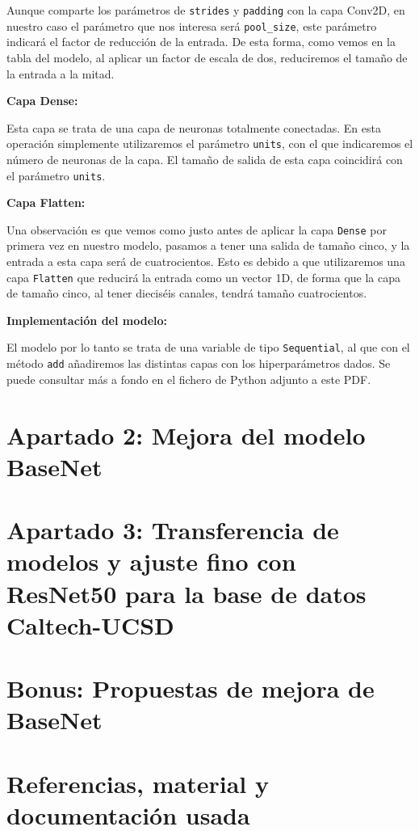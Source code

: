 \documentclass[12pt, spanish]{article}
\begin{document}
Aunque comparte los parámetros de \texttt{strides} y \texttt{padding} con la capa Conv2D, en nuestro caso el parámetro que nos interesa será \texttt{pool\_size}, este parámetro indicará el factor de reducción de la entrada. De esta forma, como vemos en la tabla del modelo, al aplicar un factor de escala de dos, reduciremos el tamaño de la entrada a la mitad.


\textbf{Capa Dense:}

Esta capa se trata de una capa de neuronas totalmente conectadas. En esta operación simplemente utilizaremos el parámetro \texttt{units}, con el que indicaremos el número de neuronas de la capa. El tamaño de salida de esta capa coincidirá con el parámetro \texttt{units}.


\textbf{Capa Flatten:}


Una observación es que vemos como justo antes de aplicar la capa \texttt{Dense} por primera vez en nuestro modelo, pasamos a tener una salida de tamaño cinco, y la entrada a esta capa será de cuatrocientos. Esto es debido a que utilizaremos una capa \texttt{Flatten}\cite{flatten} que reducirá la entrada como un vector 1D, de forma que la capa de tamaño cinco, al tener dieciséis canales, tendrá tamaño cuatrocientos.


\textbf{Implementación del modelo:}

El modelo por lo tanto se trata de una variable de tipo \texttt{Sequential}, al que con el método \texttt{add} añadiremos las distintas capas con los hiperparámetros dados. Se puede consultar más a fondo en el fichero de Python adjunto a este PDF.



\section{Apartado 2: Mejora del modelo BaseNet}

\section{Apartado 3: Transferencia de modelos y ajuste fino con ResNet50 para la base de datos Caltech-UCSD}

\section{Bonus: Propuestas de mejora de BaseNet}


\newpage

\section{Referencias, material y documentación usada}
\end{document}
